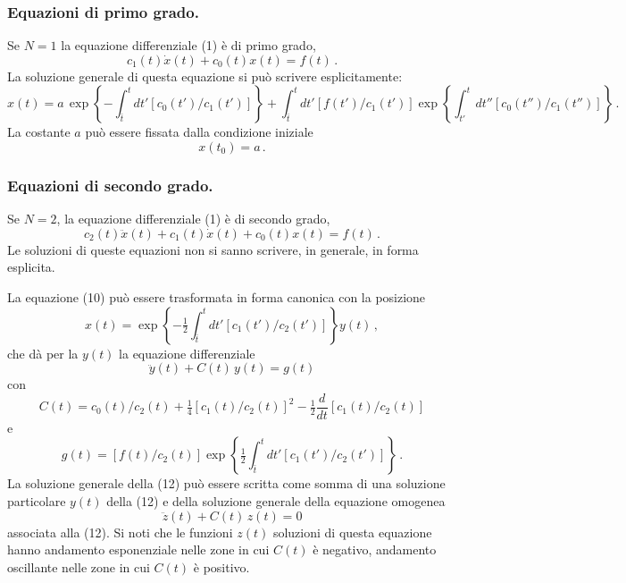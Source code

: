 \documentclass[11pt, a4paper]{book}
\numberwithin{equation}{section}
\begin{document}
\subsubsection*{Equazioni di primo grado.} Se $N=1$ la equazione differenziale (1)
è di primo grado,
\begin{equation}
    c_1(t) \dot{x}(t) + c_0(t) x(t) = f(t) \,. \tag{7}
\end{equation}
La soluzione generale di questa equazione si può scrivere esplicitamente:
\begin{equation}
    x(t) = a \, \exp\!\left\{ -\int_{\bar{t}}^{t} dt' \left[ c_0(t')/c_1(t') \right] \right\} +
    \int_{\bar{t}}^{t} dt' \left[ f(t')/c_1(t') \right] \exp\!\left\{ \int_{t'}^{t} dt'' \left[ c_0(t'')/c_1(t'') \right] \right\} \,. \tag{8}
\end{equation}
La costante $a$ può essere fissata dalla condizione iniziale
\begin{equation}
    x(t_0) = a \,. \tag{9}
\end{equation}

\subsubsection*{Equazioni di secondo grado.} Se $N=2$, la equazione differenziale
(1) è di secondo grado,
\begin{equation}
    c_2(t) \ddot{x}(t) + c_1(t) \dot{x}(t) + c_0(t) x(t) = f(t) \,. \tag{10}
\end{equation}
Le soluzioni di queste equazioni non si sanno scrivere, in generale, in forma
esplicita.

La equazione (10) può essere trasformata in forma canonica con la posizione
\begin{equation}
    x(t) = \exp\!\left\{ -\tfrac{1}{2} \int_{\bar{t}}^{t} dt' \left[ c_1(t')/c_2(t') \right] \right\} y(t) \,, \tag{11}
\end{equation}
che dà per la $y(t)$ la equazione differenziale
\begin{equation}
    \ddot{y}(t) + C(t) \, y(t) = g(t) \tag{12}
\end{equation}
con
\begin{equation}
    C(t) = c_0(t)/c_2(t) + \tfrac{1}{4} \left[ c_1(t)/c_2(t) \right]^2 - \tfrac{1}{2} \frac{d}{dt}\left[ c_1(t)/c_2(t) \right] \tag{13}
\end{equation}
e
\begin{equation}
    g(t) = \left[ f(t)/c_2(t) \right] \exp\!\left\{ \tfrac{1}{2} \int_{\bar{t}}^{t} dt' \left[ c_1(t')/c_2(t') \right] \right\} \,. \tag{14}
\end{equation}
La soluzione generale della (12) può essere scritta come somma di una
soluzione particolare $y(t)$ della (12) e della soluzione generale della
equazione omogenea
\begin{equation}
    \ddot{z}(t) + C(t) \, z(t) = 0 \tag{15}
\end{equation}
associata alla (12). Si noti che le funzioni $z(t)$ soluzioni di questa equazione
hanno andamento esponenziale nelle zone in cui $C(t)$ è negativo, andamento
oscillante nelle zone in cui $C(t)$ è positivo.
\end{document}
